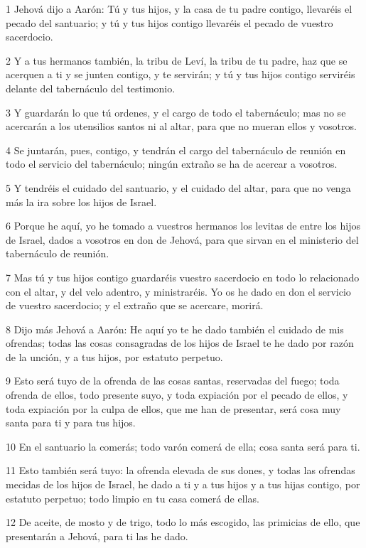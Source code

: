 \par 1 Jehová dijo a Aarón: Tú y tus hijos, y la casa de tu padre contigo, llevaréis el pecado del santuario; y tú y tus hijos contigo llevaréis el pecado de vuestro sacerdocio.
\par 2 Y a tus hermanos también, la tribu de Leví, la tribu de tu padre, haz que se acerquen a ti y se junten contigo, y te servirán; y tú y tus hijos contigo serviréis delante del tabernáculo del testimonio.
\par 3 Y guardarán lo que tú ordenes, y el cargo de todo el tabernáculo; mas no se acercarán a los utensilios santos ni al altar, para que no mueran ellos y vosotros.
\par 4 Se juntarán, pues, contigo, y tendrán el cargo del tabernáculo de reunión en todo el servicio del tabernáculo; ningún extraño se ha de acercar a vosotros.
\par 5 Y tendréis el cuidado del santuario, y el cuidado del altar, para que no venga más la ira sobre los hijos de Israel.
\par 6 Porque he aquí, yo he tomado a vuestros hermanos los levitas de entre los hijos de Israel, dados a vosotros en don de Jehová, para que sirvan en el ministerio del tabernáculo de reunión.
\par 7 Mas tú y tus hijos contigo guardaréis vuestro sacerdocio en todo lo relacionado con el altar, y del velo adentro, y ministraréis. Yo os he dado en don el servicio de vuestro sacerdocio; y el extraño que se acercare, morirá.
\par 8 Dijo más Jehová a Aarón: He aquí yo te he dado también el cuidado de mis ofrendas; todas las cosas consagradas de los hijos de Israel te he dado por razón de la unción, y a tus hijos, por estatuto perpetuo.
\par 9 Esto será tuyo de la ofrenda de las cosas santas, reservadas del fuego; toda ofrenda de ellos, todo presente suyo, y toda expiación por el pecado de ellos, y toda expiación por la culpa de ellos, que me han de presentar, será cosa muy santa para ti y para tus hijos.
\par 10 En el santuario la comerás; todo varón comerá de ella; cosa santa será para ti.
\par 11 Esto también será tuyo: la ofrenda elevada de sus dones, y todas las ofrendas mecidas de los hijos de Israel, he dado a ti y a tus hijos y a tus hijas contigo, por estatuto perpetuo; todo limpio en tu casa comerá de ellas.
\par 12 De aceite, de mosto y de trigo, todo lo más escogido, las primicias de ello, que presentarán a Jehová, para ti las he dado.
